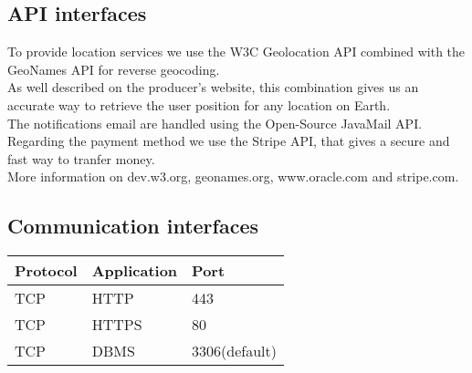 \subsection{API interfaces}
To provide location services we use the W3C Geolocation API combined with the GeoNames API for reverse geocoding. 
\\As well described on the producer's website, this combination gives us an accurate way to retrieve the user position for any location on Earth. 
\\The notifications email are handled using the Open-Source JavaMail API.
\\Regarding the payment method we use the Stripe API, that gives a secure and fast way to tranfer money. 
\\More information on dev.w3.org, geonames.org, www.oracle.com and stripe.com.

\subsection{Communication interfaces}
\begin{center}
	\begin{tabular}{|l|l|l|}
	    \hline
	    Protocol & Application & Port \\\hline
	    \hline
	    TCP & HTTP & 443 \\\hline
	    TCP & HTTPS & 80 \\\hline
	    TCP & DBMS & 3306(default) \\\hline
	\end{tabular}
\end{center}